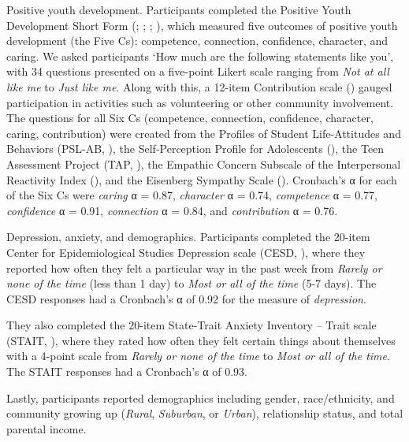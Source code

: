 \documentclass[
  jou,
  longtable,
  nolmodern,
  notxfonts,
  notimes,
  colorlinks=true,linkcolor=blue,citecolor=blue,urlcolor=blue]{apa7}
\begin{document}
{Positive youth development.} Participants completed the Positive Youth
Development Short Form (; ;
;
), which measured
five outcomes of positive youth development (the Five Cs): competence,
connection, confidence, character, and caring. We asked participants
`How much are the following statements like you', with 34 questions
presented on a five-point Likert scale ranging from \emph{Not at all
like me} to \emph{Just like me}. Along with this, a 12-item Contribution
scale () gauged participation
in activities such as volunteering or other community involvement. The
questions for all Six Cs (competence, connection, confidence, character,
caring, contribution) were created from the Profiles of Student
Life-Attitudes and Behaviors (PSL-AB,
), the
Self-Perception Profile for Adolescents
(), the Teen Assessment Project
(TAP, ), the
Empathic Concern Subscale of the Interpersonal Reactivity Index
(), and the Eisenberg Sympathy
Scale ().
Cronbach's α for each of the Six Cs were \emph{caring} α = 0.87,
\emph{character} α = 0.74, \emph{competence} α = 0.77, \emph{confidence}
α = 0.91, \emph{connection} α = 0.84, and \emph{contribution} α = 0.76.

{Depression, anxiety, and demographics.} Participants completed the
20-item Center for Epidemiological Studies Depression scale (CESD,
), where they reported how
often they felt a particular way in the past week from \emph{Rarely or
none of the time} (less than 1 day) to \emph{Most or all of the time}
(5-7 days). The CESD responses had a Cronbach's α of 0.92 for the
measure of \emph{depression}.

They also completed the 20-item State-Trait Anxiety Inventory -- Trait
scale (STAIT, ), where
they rated how often they felt certain things about themselves with a
4-point scale from \emph{Rarely or none of the time} to \emph{Most or
all of the time}. The STAIT responses had a Cronbach's α of 0.93.

Lastly, participants reported demographics including gender,
race/ethnicity, and community growing up (\emph{Rural}, \emph{Suburban},
or \emph{Urban}), relationship status, and total parental income.
\end{document}
